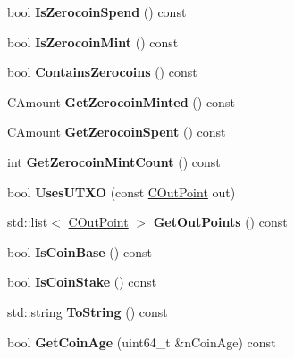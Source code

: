 \begin{DoxyCompactItemize}
\item 
\mbox{\label{class_c_transaction_a4cda5603795c5f9179d4c8bd43f809cd}} 
bool {\bfseries Is\+Zerocoin\+Spend} () const
\item 
\mbox{\label{class_c_transaction_ab91efb1c2312e6feeecfbbfff11abbb1}} 
bool {\bfseries Is\+Zerocoin\+Mint} () const
\item 
\mbox{\label{class_c_transaction_a613051e8e5651a7500cb455f37dd1116}} 
bool {\bfseries Contains\+Zerocoins} () const
\item 
\mbox{\label{class_c_transaction_a1af92675c3c7414013cc435bfb73f1e4}} 
C\+Amount {\bfseries Get\+Zerocoin\+Minted} () const
\item 
\mbox{\label{class_c_transaction_a531f3c53fe315296726dcdbf0b22f1dc}} 
C\+Amount {\bfseries Get\+Zerocoin\+Spent} () const
\item 
\mbox{\label{class_c_transaction_ad685ade63504acb100d26535037a7ed2}} 
int {\bfseries Get\+Zerocoin\+Mint\+Count} () const
\item 
\mbox{\label{class_c_transaction_a332488544b143d4409d0ce50acaa80b6}} 
bool {\bfseries Uses\+U\+T\+XO} (const \mbox{\hyperlink{class_c_out_point}{C\+Out\+Point}} out)
\item 
\mbox{\label{class_c_transaction_ac3041c099eb8b4e019c26468099dcdb5}} 
std\+::list$<$ \mbox{\hyperlink{class_c_out_point}{C\+Out\+Point}} $>$ {\bfseries Get\+Out\+Points} () const
\item 
\mbox{\label{class_c_transaction_a96256e8ac1bf79ad9c057e48c41132dd}} 
bool {\bfseries Is\+Coin\+Base} () const
\item 
\mbox{\label{class_c_transaction_ace4278a41a296d40dcf5fb2b9cf007ec}} 
bool {\bfseries Is\+Coin\+Stake} () const
\item 
\mbox{\label{class_c_transaction_a80370923c3ac828de68919295d5d0659}} 
std\+::string {\bfseries To\+String} () const
\item 
\mbox{\label{class_c_transaction_a1038c65bb9818f07fefe6161af88e48f}} 
bool {\bfseries Get\+Coin\+Age} (uint64\+\_\+t \&n\+Coin\+Age) const
\end{DoxyCompactItemize}
